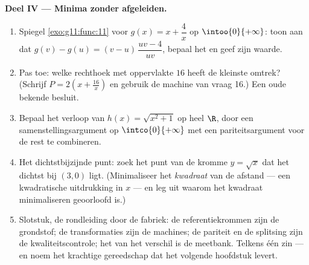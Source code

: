 \begin{problem}
\medskip
\noindent\textbf{Deel IV --- Minima zonder afgeleiden.}
\begin{enumerate}[resume]
  \item Spiegel \cref{exo:g11:func:11} voor $g(x) = x + \dfrac4x$ op
        $\intoo{0}{+\infty}$: toon aan dat
        $g(v) - g(u) = (v - u)\,\dfrac{uv - 4}{uv}$, bepaal het  en
        geef zijn waarde.
  \item Pas toe: welke rechthoek met oppervlakte $16$ heeft de kleinste
        omtrek? (Schrijf $P = 2\left(x + \frac{16}{x}\right)$ en gebruik de
        machine van vraag 16.) Een oude bekende besluit.
  \item Bepaal het verloop van $h(x) = \sqrt{x^2 + 1}$ op heel $\R$, door een
        samenstellingsargument op $\intco{0}{+\infty}$ met een
        pariteitsargument voor de rest te combineren.
  \item Het dichtstbijzijnde punt: zoek het punt van de kromme $y = \sqrt x$
        dat het dichtst bij $(3, 0)$ ligt. (Minimaliseer het \emph{kwadraat}
        van de afstand --- een kwadratische uitdrukking in $x$ --- en leg uit
        waarom het kwadraat minimaliseren geoorloofd is.)
  \item Slotstuk, de rondleiding door de fabriek: de referentiekrommen zijn
        de grondstof; de transformaties zijn de machines; de pariteit en de
        splitsing zijn de kwaliteitscontrole; het  van het verschil
        is de meetbank. Telkens één zin --- en noem het krachtige gereedschap
        dat het volgende hoofdstuk levert.
\end{enumerate}
\end{problem}

